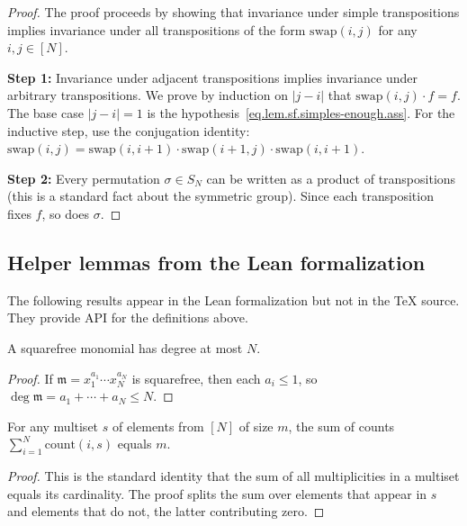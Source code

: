 \begin{proof}
The proof proceeds by showing that invariance under simple transpositions
implies invariance under all transpositions of the form $\text{swap}(i, j)$
for any $i, j \in [N]$.

\textbf{Step 1:} Invariance under adjacent transpositions
implies invariance under arbitrary transpositions.
We prove by induction on $|j - i|$ that $\text{swap}(i, j) \cdot f = f$.
The base case $|j - i| = 1$ is the hypothesis~\eqref{eq.lem.sf.simples-enough.ass}.
For the inductive step, use the conjugation identity:
$\text{swap}(i, j) = \text{swap}(i, i+1) \cdot \text{swap}(i+1, j) \cdot \text{swap}(i, i+1)$.

\textbf{Step 2:} Every permutation $\sigma \in S_N$ can be written as a product
of transpositions (this is a standard fact about the symmetric group).
Since each transposition fixes $f$, so does $\sigma$.
\end{proof}

\subsection{Helper lemmas from the Lean formalization}

The following results appear in the Lean formalization but not in the TeX source.
They provide API for the definitions above.

\begin{lemma}
\label{lem.sf.monomial-degree-le-squarefree}
\leanhelper
\leanok
A squarefree monomial has degree at most $N$.
\end{lemma}

\begin{proof}
\leanok
If $\mathfrak{m} = x_1^{a_1} \cdots x_N^{a_N}$ is squarefree, then
each $a_i \leq 1$, so $\deg \mathfrak{m} = a_1 + \cdots + a_N \leq N$.
\end{proof}

\begin{lemma}
\label{lem.sf.sum-count-eq-card}
\leanhelper
\leanok
For any multiset $s$ of elements from $[N]$ of size $m$,
the sum of counts $\sum_{i=1}^N \text{count}(i, s)$ equals $m$.
\end{lemma}

\begin{proof}
This is the standard identity that the sum of all multiplicities in
a multiset equals its cardinality. The proof splits the sum over
elements that appear in $s$ and elements that do not, the latter contributing zero.
\end{proof}

